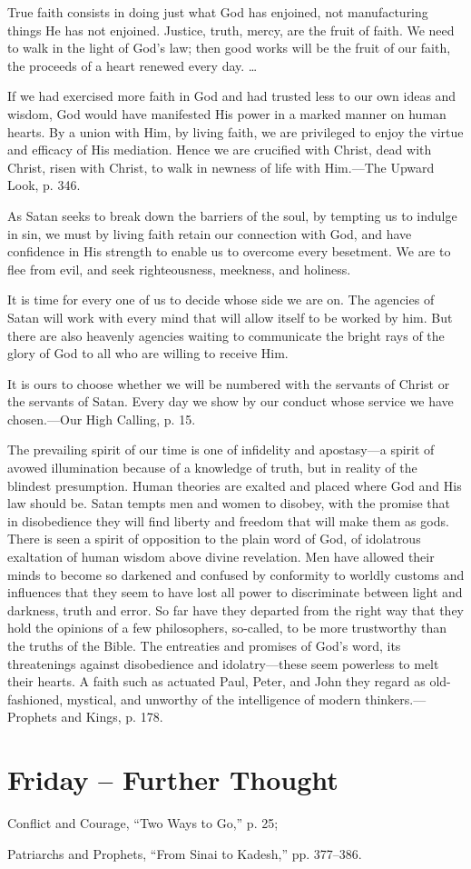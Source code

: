 \documentclass[a4paper, 10pt, twoside, headings=small]{scrartcl}
\begin{document}
\begin{multicols}{2}
True faith consists in doing just what God has enjoined, not manufacturing things He has not enjoined. Justice, truth, mercy, are the fruit of faith. We need to walk in the light of God’s law; then good works will be the fruit of our faith, the proceeds of a heart renewed every day. …

If we had exercised more faith in God and had trusted less to our own ideas and wisdom, God would have manifested His power in a marked manner on human hearts. By a union with Him, by living faith, we are privileged to enjoy the virtue and efficacy of His mediation. Hence we are crucified with Christ, dead with Christ, risen with Christ, to walk in newness of life with Him.—The Upward Look, p. 346.

As Satan seeks to break down the barriers of the soul, by tempting us to indulge in sin, we must by living faith retain our connection with God, and have confidence in His strength to enable us to overcome every besetment. We are to flee from evil, and seek righteousness, meekness, and holiness.

It is time for every one of us to decide whose side we are on. The agencies of Satan will work with every mind that will allow itself to be worked by him. But there are also heavenly agencies waiting to communicate the bright rays of the glory of God to all who are willing to receive Him.

It is ours to choose whether we will be numbered with the servants of Christ or the servants of Satan. Every day we show by our conduct whose service we have chosen.—Our High Calling, p. 15.

The prevailing spirit of our time is one of infidelity and apostasy—a spirit of avowed illumination because of a knowledge of truth, but in reality of the blindest presumption. Human theories are exalted and placed where God and His law should be. Satan tempts men and women to disobey, with the promise that in disobedience they will find liberty and freedom that will make them as gods. There is seen a spirit of opposition to the plain word of God, of idolatrous exaltation of human wisdom above divine revelation. Men have allowed their minds to become so darkened and confused by conformity to worldly customs and influences that they seem to have lost all power to discriminate between light and darkness, truth and error. So far have they departed from the right way that they hold the opinions of a few philosophers, so-called, to be more trustworthy than the truths of the Bible. The entreaties and promises of God’s word, its threatenings against disobedience and idolatry—these seem powerless to melt their hearts. A faith such as actuated Paul, Peter, and John they regard as old-fashioned, mystical, and unworthy of the intelligence of modern thinkers.—Prophets and Kings, p. 178.

\section*{Friday – Further Thought}

\setlength{\parindent}{0pt}Conflict and Courage, “Two Ways to Go,” p. 25;

Patriarchs and Prophets, “From Sinai to Kadesh,” pp. 377–386.

\end{multicols}
\end{document}
